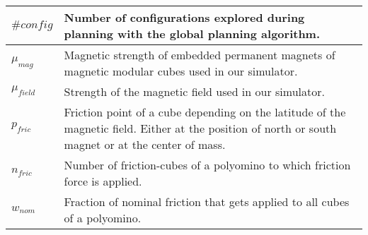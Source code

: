 \begin{xltabular}{\textwidth}{ l  X }
	$\#\textit{config}$
	&
	Number of configurations explored during planning with the global planning algorithm.
	\\ \midrule
	
	$\mu_\textit{mag}$
	&
	Magnetic strength of embedded permanent magnets of magnetic modular cubes used in our simulator.
	\\ \midrule
	
	$\mu_\textit{field}$
	&
	Strength of the magnetic field used in our simulator.
	\\ \midrule
	
	$p_\textit{fric}$
	&
	Friction point of a cube depending on the latitude of the magnetic field.
	Either at the position of north or south magnet or at the center of mass.
	\\ \midrule
	
	$n_\textit{fric}$
	&
	Number of friction-cubes of a polyomino to which friction force is applied.
	\\ \midrule
	
	$w_\textit{nom}$
	&
	Fraction of nominal friction that gets applied to all cubes of a polyomino.
	\\ \bottomrule
	
\end{xltabular}